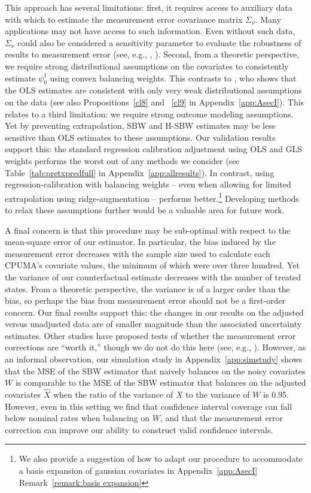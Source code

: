 \documentclass[aoas]{imsart}
\theoremstyle{plain}
\theoremstyle{remark}
\begin{document}
This approach has several limitations: first, it requires access to auxiliary data with which to estimate the measurement error covariance matrix $\Sigma_{\nu}$. Many applications may not have access to such information. Even without such data, $\Sigma_{\nu}$ could also be considered a sensitivity parameter to evaluate the robustness of results to measurement error (see, e.g., \cite{huque2014impact}, \cite{illenberger2020impact}). Second, from a theoretic perspective, we require strong distributional assumptions on the covariates to consistently estimate $\psi_0^1$ using convex balancing weights. This contrasts to \cite{gleser1992importance}, who shows that the OLS estimates are consistent with only very weak distributional assumptions on the data (see also Propositions~\ref{cl8} and ~\ref{cl9} in Appendix~\ref{app:AsecI}). This relates to a third limitation: we require strong outcome modeling assumptions. Yet by preventing extrapolation, SBW and H-SBW estimates may be less sensitive than OLS estimates to these assumptions. Our validation results support this: the standard regression calibration adjustment using OLS and GLS weights performs the worst out of any methods we consider (see Table~\ref{tab:pretxpredfull} in Appendix~\ref{app:allresults}). In contrast, using regression-calibration with balancing weights -- even when allowing for limited extrapolation using ridge-augmentation -- performs better.\footnote{We also provide a suggestion of how to adapt our procedure to accommodate a basis expansion of gaussian covariates in Appendix~\ref{app:AsecI} Remark~\ref{remark:basis expansion}} Developing methods to relax these assumptions further would be a valuable area for future work.

A final concern is that this procedure may be sub-optimal with respect to the mean-square error of our estimator. In particular, the bias induced by the measurement error decreases with the sample size used to calculate each CPUMA's covariate values, the minimum of which were over three hundred. Yet the variance of our counterfactual estimate decreases with the number of treated states. From a theoretic perspective, the variance is of a larger order than the bias, so perhaps the bias from measurement error should not be a first-order concern. Our final results support this: the changes in our results on the adjusted versus unadjusted data are of smaller magnitude than the associated uncertainty estimates. Other studies have proposed tests of whether the measurement error corrections are ``worth it,'' though we do not do this here (see, e.g., \cite{gleser1992importance}). However, as an informal observation, our simulation study in Appendix~\ref{app:simstudy} shows that the MSE of the SBW estimator that naively balances on the noisy covariates $W$ is comparable to the MSE of the SBW estimator that balances on the adjusted covariates $\hat{X}$ when the ratio of the variance of $X$ to the variance of $W$ is 0.95. However, even in this setting we find that confidence interval coverage can fall below nominal rates when balancing on $W$, and that the measurement error correction can improve our ability to construct valid confidence intervals.
\end{document}
